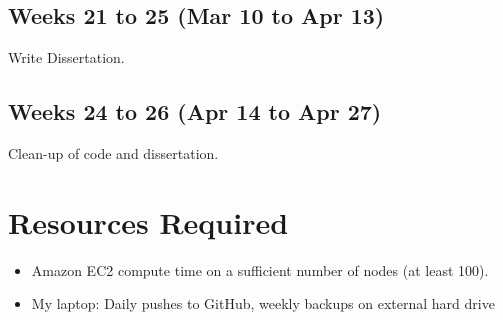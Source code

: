 \documentclass[12pt]{scrartcl}
\begin{document}
\subsection{Weeks 21 to 25 (Mar 10 to Apr 13)%
  \label{weeks-21-to-25-mar-10-to-apr-13}%
}

Write Dissertation.


\subsection{Weeks 24 to 26 (Apr 14 to Apr 27)%
  \label{weeks-24-to-26-apr-14-to-apr-27}%
}

Clean-up of code and dissertation.


\section{Resources Required%
  \label{resources-required}%
}
%
\begin{itemize}

\item Amazon EC2 compute time on a sufficient number of nodes (at least 100).

\item My laptop: Daily pushes to GitHub, weekly backups on external hard drive

\end{itemize}



\end{document}
